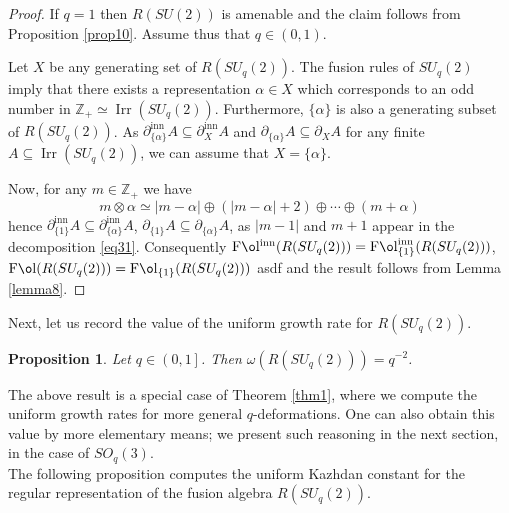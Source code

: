 \documentclass[11 pt, leqno]{amsart}
\newcommand{\ZZ}{\mathbb{Z}}
\DeclareMathOperator{\Fol}{F\mathrm{\o}l}
\DeclareMathOperator{\Folinn}{F\mathrm{\o}l^{inn}}
\newcommand{\Folinnj}{\operatorname{F\mathrm{\o}l}_{\{1\}}^{\operatorname{inn}}}
\DeclareMathOperator{\Irr}{Irr}
\DeclareMathOperator{\inn}{inn}
\newtheorem{proposition}[theorem]{Proposition}
\theoremstyle{definition}
\numberwithin{equation}{section}
\begin{document}
\begin{proof}
	If $q=1$ then  $R(SU(2))$ is amenable and the claim follows from Proposition \ref{prop10}. Assume thus that $q \in (0,1)$.
	
	Let $X$ be any generating set of $R(SU_q(2))$. The fusion rules of $SU_q(2)$ imply that there exists a representation $\alpha\in X$ which corresponds to an odd number in $\ZZ_+\simeq \Irr(SU_q(2))$. Furthermore, $\{\alpha\}$ is also a generating subset of $R(SU_q(2))$. As $\partial_{\{\alpha\}}^{\inn} A\subseteq \partial_X^{\inn} A$ and $\partial_{\{\alpha\}} A\subseteq \partial_X A$ for any finite $A\subseteq \Irr(SU_q(2))$, we can assume that $X=\{\alpha\}$. 
	
	Now, for any $m\in \ZZ_+$ we have
	\begin{equation}\label{eq31}
	m\otimes \alpha  \simeq |m-\alpha | \oplus (|m-\alpha|+2) \oplus\cdots\oplus
	(m+\alpha)
	\end{equation}
	hence $\partial_{\{1\}}^{\inn} A \subseteq \partial_{\{\alpha\}}^{\inn} A$,  $\partial_{\{1\}} A \subseteq \partial_{\{\alpha\}}A$, as $|m-1|$ and $m+1$ appear in the decomposition \eqref{eq31}. Consequently $\Folinn (R(SU_q(2)))=\Folinnj(R(SU_q(2)))$,
$\Fol (R(SU_q(2)))=\Fol_{\{1\}}(R(SU_q(2)))$ asdf and the result follows from Lemma \ref{lemma8}.
\end{proof}

Next, let us record the value of the uniform growth rate for $R(SU_q(2))$.

\begin{proposition}\label{prop14}
Let $q\in \left(0,1\right]$. Then $\omega(R(SU_q(2)))=q^{-2}$.
\end{proposition}

The above result is a special case of Theorem \ref{thm1}, where we compute the uniform growth rates for more general $q$-deformations. One can also obtain this value by more elementary means; we present such reasoning in the next section, in the case of $SO_q(3)$.\\

The following proposition computes the uniform Kazhdan constant for the regular representation of the fusion algebra 
$R(SU_q(2))$.
\end{document}
